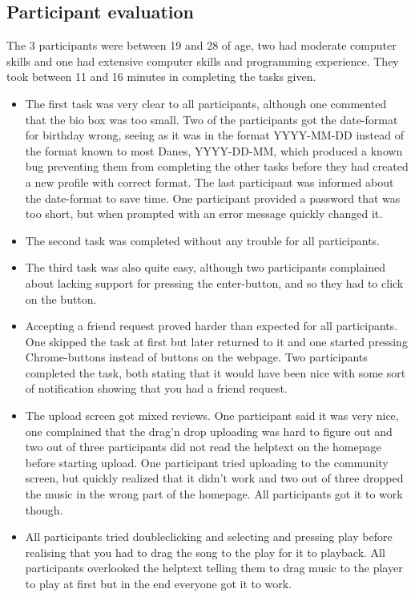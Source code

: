 \subsection{Participant evaluation}
The 3 participants were between 19 and 28 of age, two had moderate computer skills and one had extensive computer skills and programming experience. They took between 11 and 16 minutes in completing the tasks given.
\begin{itemize}
	\item The first task was very clear to all participants, although one commented that the bio box was too small. Two of the participants got the date-format for birthday wrong, seeing as it was in the format YYYY-MM-DD instead of the format known to most Danes, YYYY-DD-MM, which produced a known bug preventing them from completing the other tasks before they had created a new profile with correct format. The last participant was informed about the date-format to save time. One participant provided a password that was too short, but when prompted with an error message quickly changed it.
	\item The second task was completed without any trouble for all participants.
	\item The third task was also quite easy, although two participants complained about lacking support for pressing the enter-button, and so they had to click on the button.
	\item Accepting a friend request proved harder than expected for all participants. One skipped the task at first but later returned to it and one started pressing Chrome-buttons instead of buttons on the webpage. Two participants completed the task, both stating that it would have been nice with some sort of notification showing that you had a friend request.
	\item The upload screen got mixed reviews. One participant said it was very nice, one complained that the drag'n drop uploading was hard to figure out and two out of three participants did not read the helptext on the homepage before starting upload. One participant tried uploading to the community screen, but quickly realized that it didn't work and two out of three dropped the music in the wrong part of the homepage. All participants got it to work though.
	\item All participants tried doubleclicking and selecting and pressing play before realising that you had to drag the song to the play for it to playback. All participants overlooked the helptext telling them to drag music to the player to play at first but in the end everyone got it to work.

\end{itemize}
